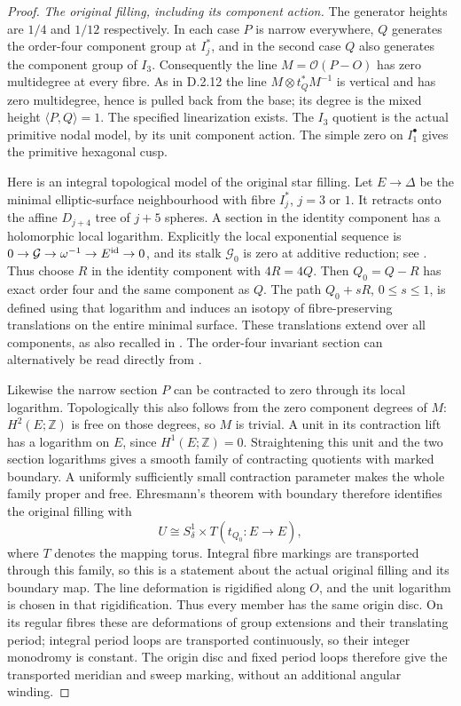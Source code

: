 \begin{proof}
\emph{The original filling, including its component action.}
The generator heights are $1/4$ and $1/12$ respectively.
In each case $P$ is narrow everywhere, $Q$ generates the
order-four component group at $I_j^*$, and in the second
case $Q$ also generates the component group of $I_3$.
Consequently the line $M=\mathcal O(P-O)$ has zero
multidegree at every fibre. As in D.2.12 the line
$M\otimes t_Q^*M^{-1}$ is vertical and has zero multidegree,
hence is pulled back from the base; its degree is the mixed
height $\langle P,Q\rangle=1$. The specified linearization
exists. The $I_3$ quotient is the actual primitive nodal
model, by its unit component action. The simple zero on
$I_1^\bullet$ gives the primitive hexagonal cusp.

Here is an integral topological model of the original star
filling. Let $E\to\Delta$ be the minimal elliptic-surface
neighbourhood with fibre $I_j^*$, $j=3$ or $1$.
It retracts onto the affine $D_{j+4}$ tree of $j+5$ spheres.
A section in the identity component has a holomorphic local
logarithm. Explicitly the local exponential sequence is
$0\to\mathcal G\to\omega^{-1}\to E^{\rm id}\to0$,
and its stalk $\mathcal G_0$ is zero at additive reduction;
see \cite[Section 2.4, (2.2)]{manUU21}.
Thus choose $R$ in the identity component with $4R=4Q$.
Then $Q_0=Q-R$ has exact order four and the same component
as $Q$. The path $Q_0+sR$, $0\le s\le1$, is defined using
that logarithm and induces an isotopy of fibre-preserving
translations on the entire minimal surface. These
translations extend over all components, as also recalled in
\cite[Sections 7.6--7.7]{manSS10}. The order-four invariant
section can alternatively be read directly from
\cite[Proposition 3.5(1),(3) and its proof]{manUU21}.

Likewise the narrow section $P$ can be contracted to zero
through its local logarithm. Topologically this also follows
from the zero component degrees of $M$: $H^2(E;\mathbb Z)$
is free on those degrees, so $M$ is trivial. A unit in its
contraction lift has a logarithm on $E$, since $H^1(E;\mathbb Z)=0$.
Straightening this unit and the two section logarithms gives
a smooth family of contracting quotients with marked boundary.
A uniformly sufficiently small contraction parameter makes
the whole family proper and free. Ehresmann's theorem with
boundary therefore identifies the original filling with
\[
 U\cong S^1_\delta\times T(t_{Q_0}:E\to E),
 \tag{D.T4}
\]
where $T$ denotes the mapping torus. Integral fibre markings
are transported through this family, so this is a statement
about the actual original filling and its boundary map.
The line deformation is rigidified along $O$, and the unit
logarithm is chosen in that rigidification. Thus every member
has the same origin disc. On its regular fibres these are
deformations of group extensions and their translating period;
integral period loops are transported continuously, so their
integer monodromy is constant. The origin disc and fixed
period loops therefore give the transported meridian and sweep
marking, without an additional angular winding.


\end{proof}

